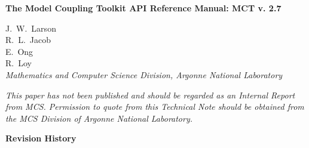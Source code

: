 \documentclass{article}
\begin{document}
\begin{sloppypar}
{\huge\bf
The Model Coupling Toolkit API Reference Manual: MCT v. 2.7
\\ }                     %
\end{sloppypar}

\vspace{.3in}
\noindent J.~W.~Larson\\
R.~L.~Jacob\\
E.~Ong\\
R.~Loy\\
\vspace{.2in} {\em Mathematics and Computer Science Division,
Argonne National Laboratory\\}

\vfill

{\em This paper has not been published and should  be regarded as
an Internal Report from MCS. Permission to quote from this
Technical Note should be  obtained from the MCS Division of
Argonne National Laboratory.}

\vspace{0.4in}


\thispagestyle{empty}
\newpage




\newpage
\setcounter{page}{2}     %


\vspace*{\fill}

\centerline{\huge\bf Revision History}

\bigskip
{}
\end{document}
